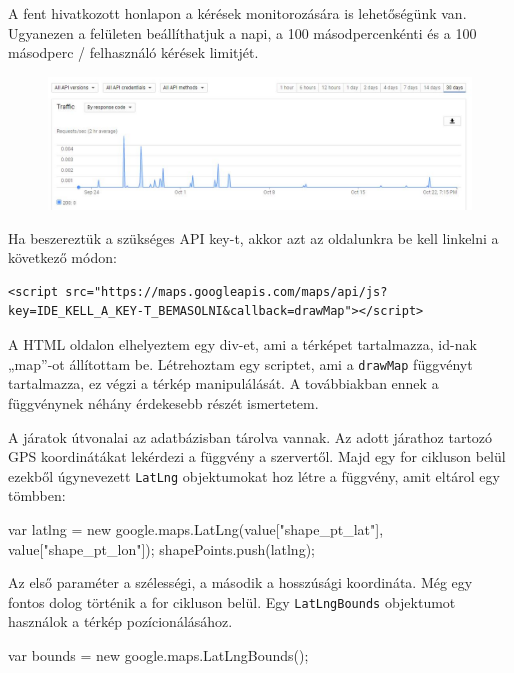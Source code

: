 A fent hivatkozott honlapon a kérések monitorozására is lehetőségünk van. Ugyanezen a felületen beállíthatjuk a napi, a 100 másodpercenkénti és a 100 másodperc / felhasználó kérések limitjét.

\begin{figure}[htb]
\centering
\includegraphics[scale=0.5]{kepek/google_maps_api_2.jpg}
\caption{}
\label{fig:google_maps_api_2}
\end{figure}

Ha beszereztük a szükséges API key-t, akkor azt az oldalunkra be kell linkelni a következő módon:

\begin{verbatim}
<script src="https://maps.googleapis.com/maps/api/js?key=IDE_KELL_A_KEY-T_BEMASOLNI&callback=drawMap"></script>
\end{verbatim}

A HTML oldalon elhelyeztem egy div-et, ami a térképet tartalmazza, id-nak „map”-ot állítottam be. Létrehoztam egy scriptet, ami a \texttt{drawMap} függvényt tartalmazza, ez végzi a térkép manipulálását. A továbbiakban ennek a függvénynek néhány érdekesebb részét ismertetem.

A járatok útvonalai az adatbázisban tárolva vannak. Az adott járathoz tartozó GPS koordinátákat lekérdezi a függvény a szervertől. Majd egy for cikluson belül ezekből úgynevezett \texttt{LatLng} objektumokat hoz létre a függvény, amit eltárol egy tömbben:

\begin{cpp}
var latlng = new google.maps.LatLng(value["shape_pt_lat"], value["shape_pt_lon"]);
shapePoints.push(latlng);
\end{cpp}

Az első paraméter a szélességi, a második a hosszúsági koordináta. Még egy fontos dolog történik a for cikluson belül. Egy \texttt{LatLngBounds} objektumot használok a térkép pozícionálásához.

\begin{cpp}
var bounds = new google.maps.LatLngBounds();
\end{cpp}

